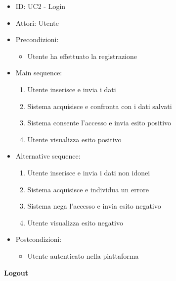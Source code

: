 \documentclass{article}
\begin{document}
\begin{itemize}[label = { }]
    \itemsep0px
    \item ID: UC2 - Login
    \item Attori: Utente
    \item Precondizioni: 
        \begin{itemize}[label = {-}]
            \item Utente ha effettuato la registrazione
        \end{itemize}
    \item Main sequence: 
        \begin{enumerate}
            \item Utente inserisce e invia i dati
            \item Sistema acquisisce e confronta con i dati salvati
            \item Sistema consente l'accesso e invia esito positivo
            \item Utente visualizza esito positivo
        \end{enumerate}
    \item Alternative sequence:
        \begin{enumerate}
            \item Utente inserisce e invia i dati non idonei
            \item Sistema acquisisce e individua un errore
            \item Sistema nega l'accesso e invia esito negativo
            \item Utente visualizza esito negativo
        \end{enumerate}
    \item Postcondizioni: 
        \begin{itemize}[label = {-}]
            \item Utente autenticato nella piattaforma
        \end{itemize}
\end{itemize}
\textbf{Logout}
\end{document}
